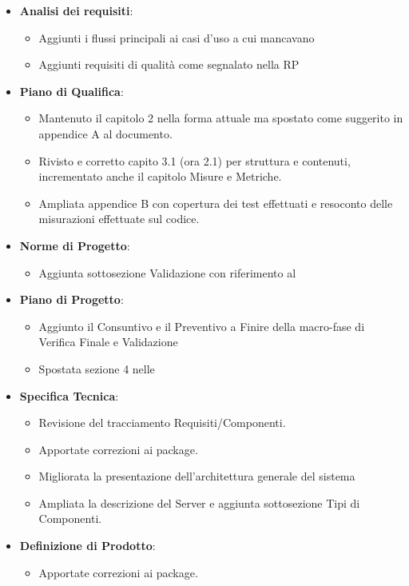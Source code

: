 \begin{itemize}
	\item \textbf{Analisi dei requisiti}:
	\begin{itemize}
		\item Aggiunti i flussi principali ai casi d'uso a cui mancavano
		\item Aggiunti requisiti di qualità come segnalato nella RP
	\end{itemize}
	\item \textbf{Piano di Qualifica}:
	\begin{itemize}
		\item Mantenuto il capitolo 2 nella forma attuale ma spostato come suggerito in appendice A al documento.
		\item Rivisto e corretto capito 3.1 (ora 2.1) per struttura e contenuti, incrementato anche il capitolo Misure e Metriche.
		\item Ampliata appendice B con copertura dei test effettuati e resoconto delle misurazioni effettuate sul codice.
	\end{itemize}
	\item \textbf{Norme di Progetto}:
	\begin{itemize}
		\item Aggiunta sottosezione Validazione con riferimento al \PdQ{}
	\end{itemize}
	\item \textbf{Piano di Progetto}:
	\begin{itemize}
		\item Aggiunto il Consuntivo e il Preventivo a Finire della macro-fase di Verifica Finale e Validazione
		\item Spostata sezione 4 nelle \NdP{}
	\end{itemize}	
	\item \textbf{Specifica Tecnica}:
	\begin{itemize}
		\item Revisione del tracciamento Requisiti/Componenti.
		\item Apportate correzioni ai package.
		\item Migliorata la presentazione dell'architettura generale del sistema
		\item Ampliata la descrizione del Server e aggiunta sottosezione Tipi di Componenti.
	\end{itemize}
	\item \textbf{Definizione di Prodotto}:
	\begin{itemize}
		\item Apportate correzioni ai package.

\end{itemize}
\end{itemize}
